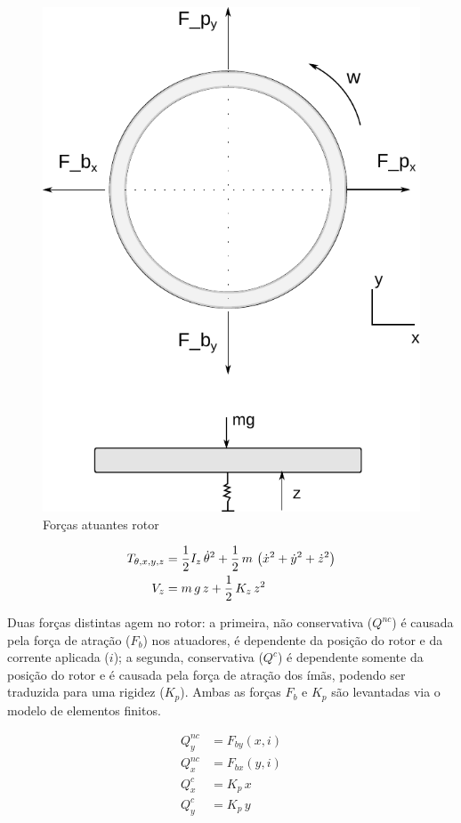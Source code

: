  \begin{figure}[th]
 	\centering
 	\includegraphics[width=0.7\linewidth]{../Figs/Modelagem/forcas}
 	\caption{Forças atuantes rotor}
 	\label{fig:modelo:forcas}
 \end{figure}
 
 \begin{align}
 	T_{\theta, x, y, z} &= \frac{1}{2} I_z \, \dot{\theta}^2 + \frac{1}{2} \, m \, \left( \dot{x}^2 + \dot{y}^2 + \dot{z}^2 \right) \notag \\
 	V_z &= m \, g \, z + \frac{1}{2} \, K_z \, z^2
 \end{align}	
 	
 Duas forças distintas agem no rotor: a primeira, não conservativa ($Q^{nc}$) é causada pela força de atração ($F_b$) nos atuadores, é dependente da posição do rotor e da corrente aplicada ($i$); a segunda, conservativa ($Q^{c}$) é dependente somente da posição do rotor e é causada pela força de atração dos ímãs, podendo ser traduzida para uma rigidez ($K_p$). Ambas as forças $F_b$ e $K_p$ são levantadas via o modelo de elementos finitos. 
	 	
 \begin{align}
 	Q_y^{nc} &= F_{by}(x,i)  \\
 	Q_x^{nc} &= F_{bx}(y,i)  \\
 	Q^{c}_x  &= K_p \, x \\
 	Q^{c}_y  &= K_p \, y 
 \end{align}
  
